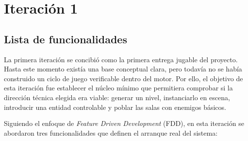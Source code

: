 \chapter{Iteración 1}

\begin{abstract}
Esta iteración recoge la primera base jugable del proyecto. En ella se construyen los
elementos mínimos necesarios para validar la viabilidad técnica del videojuego:
generación procedural del mapa, incorporación del jugador y activación inicial de
enemigos dentro de las salas.
\end{abstract}

\section{Lista de funcionalidades}
La primera iteración se concibió como la primera entrega jugable del proyecto. Hasta este
momento existía una base conceptual clara, pero todavía no se había construido un ciclo de
juego verificable dentro del motor. Por ello, el objetivo de esta iteración fue establecer
el núcleo mínimo que permitiera comprobar si la dirección técnica elegida era viable:
generar un nivel, instanciarlo en escena, introducir una entidad controlable y poblar las
salas con enemigos básicos.

Siguiendo el enfoque de \textit{Feature Driven Development} (FDD), en esta iteración se
abordaron tres funcionalidades que definen el arranque real del sistema:

